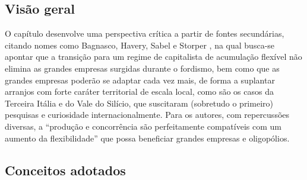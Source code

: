 \documentclass[hidelinks,a4paper,reprint,prl]{revtex4}
\begin{document}
	\subsection{Visão geral}
	
	O capítulo desenvolve uma perspectiva crítica a partir de fontes secundárias, citando nomes como Bagnasco, Havery, Sabel e Storper \cite[p.104, p.114 ]{martinelli1994}, na qual busca-se apontar que a transição para um regime de capitalista de acumulação flexível não elimina as grandes empresas surgidas durante o fordismo, bem como que as grandes empresas poderão se adaptar cada vez mais, de forma a suplantar arranjos com forte caráter territorial de escala local, como são os casos da Terceira Itália e do Vale do Silício, que suscitaram (sobretudo o primeiro) pesquisas e curiosidade internacionalmente. Para os autores, com repercussões diversas, a ``produção e concorrência são perfeitamente compatíveis com um aumento da flexibilidade'' \cite[p.103]{martinelli1994} que possa beneficiar grandes empresas e oligopólios.
	
	\subsection{Conceitos adotados}
	
\end{document}
